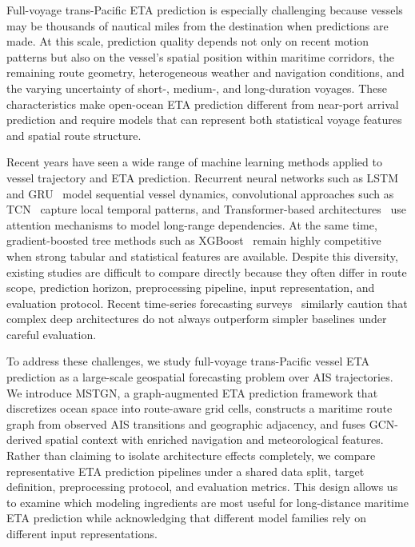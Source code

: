 \documentclass[sigconf,anonymous]{acmart}%
\begin{document}
Full-voyage trans-Pacific ETA prediction is especially challenging because vessels may be thousands of nautical miles from the destination when predictions are made.
At this scale, prediction quality depends not only on recent motion patterns but also on the vessel's spatial position within maritime corridors, the remaining route geometry, heterogeneous weather and navigation conditions, and the varying uncertainty of short-, medium-, and long-duration voyages.
These characteristics make open-ocean ETA prediction different from near-port arrival prediction and require models that can represent both statistical voyage features and spatial route structure.

Recent years have seen a wide range of machine learning methods applied to vessel trajectory and ETA prediction.
Recurrent neural networks such as LSTM~\cite{zhang2022lstm} and GRU~\cite{han2021gru} model sequential vessel dynamics, convolutional approaches such as TCN~\cite{bai2018tcn} capture local temporal patterns, and Transformer-based architectures~\cite{dong2023transformer, zhou2021informer} use attention mechanisms to model long-range dependencies.
At the same time, gradient-boosted tree methods such as XGBoost~\cite{chen2016xgboost} remain highly competitive when strong tabular and statistical features are available.
Despite this diversity, existing studies are difficult to compare directly because they often differ in route scope, prediction horizon, preprocessing pipeline, input representation, and evaluation protocol.
Recent time-series forecasting surveys~\cite{kim2025comprehensive, zeng2023transformers} similarly caution that complex deep architectures do not always outperform simpler baselines under careful evaluation.

To address these challenges, we study full-voyage trans-Pacific vessel ETA prediction as a large-scale geospatial forecasting problem over AIS trajectories.
We introduce MSTGN, a graph-augmented ETA prediction framework that discretizes ocean space into route-aware grid cells, constructs a maritime route graph from observed AIS transitions and geographic adjacency, and fuses GCN-derived spatial context with enriched navigation and meteorological features.
Rather than claiming to isolate architecture effects completely, we compare representative ETA prediction pipelines under a shared data split, target definition, preprocessing protocol, and evaluation metrics.
This design allows us to examine which modeling ingredients are most useful for long-distance maritime ETA prediction while acknowledging that different model families rely on different input representations.
\end{document}
